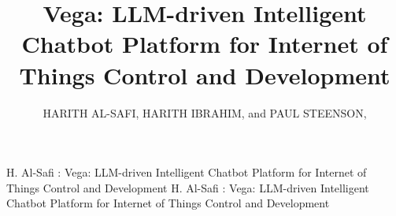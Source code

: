 \documentclass{ieeeaccess}
\begin{document}

\title{Vega: LLM-driven Intelligent Chatbot Platform for Internet of Things Control and Development}
\author{\uppercase{Harith Al-Safi},
    \uppercase{Harith Ibrahim}, and {\uppercase{Paul Steenson},
    }}

\address{School of Electronics and Electrical Engineering, University of Leeds,
    Leeds LS2 9JT, U.K}



\markboth
{H. Al-Safi \headeretal: Vega: LLM-driven Intelligent Chatbot Platform for Internet of Things Control and Development}
{H. Al-Safi \headeretal: Vega: LLM-driven Intelligent Chatbot Platform for Internet of Things Control and Development}

\end{document}
